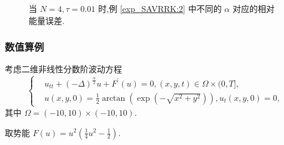 \documentclass[aspectratio=169]{beamer}
\numberwithin{theorem}{section} %
\begin{document}
\begin{frame}%
	\begin{figure}[H]
		\begin{center}
		\caption{当 $N=4, \tau=0.01$ 时,例 \ref{exp_SAVRRK:2} 中不同的 $\alpha$ 对应的相对能量误差.}
		\label{fig_SAVRRK:2-4}
		\end{center}
		\end{figure}
\end{frame}
\begin{frame}\frametitle{数值算例}
	\begin{example}\label{exp_SAVRRK:3}
		考虑二维非线性分数阶波动方程\cite{wangUnconditionalEnergyDissipation2021} 
		\begin{equation}
		\begin{cases}
		& u_{t t}+(-\Delta)^{\frac{\alpha}{2}} u+F^{\prime}(u)=0,(x, y, t) \in \Omega \times(0, T],\\
		& u(x, y, 0)=\frac{1}{2} \arctan \left(\exp \left(-\sqrt{x^2+y^2}\right)\right), u_t(x, y, 0)=0,
		\end{cases}
		\end{equation}
		其中 $\Omega=(-10,10) \times(-10,10)$.
		\end{example}
		
		取势能 $F(u)=u^2\left(\frac{1}{4} u^2-\frac{1}{2}\right)$.
\end{frame}
\end{document}
